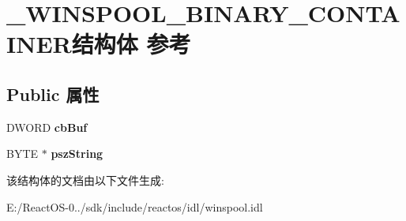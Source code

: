 \hypertarget{struct___w_i_n_s_p_o_o_l___b_i_n_a_r_y___c_o_n_t_a_i_n_e_r}{}\section{\+\_\+\+W\+I\+N\+S\+P\+O\+O\+L\+\_\+\+B\+I\+N\+A\+R\+Y\+\_\+\+C\+O\+N\+T\+A\+I\+N\+E\+R结构体 参考}
\label{struct___w_i_n_s_p_o_o_l___b_i_n_a_r_y___c_o_n_t_a_i_n_e_r}
\subsection*{Public 属性}
\begin{DoxyCompactItemize}
\item 
\mbox{\label{struct___w_i_n_s_p_o_o_l___b_i_n_a_r_y___c_o_n_t_a_i_n_e_r_a95e45201316bfbb3abd09f4fa82c6ab8}} 
D\+W\+O\+RD {\bfseries cb\+Buf}
\item 
\mbox{\label{struct___w_i_n_s_p_o_o_l___b_i_n_a_r_y___c_o_n_t_a_i_n_e_r_a5a74c5af7bb518770bf0f00143c0b938}} 
B\+Y\+TE $\ast$ {\bfseries psz\+String}
\end{DoxyCompactItemize}


该结构体的文档由以下文件生成\+:\begin{DoxyCompactItemize}
\item 
E\+:/\+React\+O\+S-\/0../sdk/include/reactos/idl/winspool.\+idl\end{DoxyCompactItemize}
